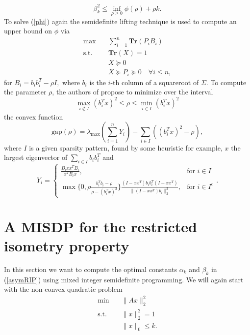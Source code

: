 \documentclass{elsarticle}
\begin{document}
\begin{equation*}
 \beta_k^2 \leq \inf_{\rho \geq 0} \phi(\rho) + \rho k.
\end{equation*}
To solve (\ref{phi}) again the semidefinite lifting technique is used to compute an upper bound on $\phi$ via
\begin{align}\label{Asp08}
 \text{max} \quad & \sum_{i=1}^n\textbf{Tr}(P_iB_i) \nonumber \\
 \text{s.t.} \quad & \textbf{Tr}(X) = 1 \nonumber \\
 & X \succeq 0 \tag{Asp08} \\
 & X \succeq P_i \succeq 0 \quad \forall i \leq n, \nonumber
\end{align}
for $B_i = b_ib_i^T - \rho I,$ where $b_i$ is the $i$-th column of a squareroot of $\Sigma$. To compute the parameter $\rho$, the authors of \cite{Asp07} propose to minimize over the interval
\begin{equation*}
 \max_{i \notin I} (b_i^Tx)^2 \leq \rho \leq  \min_{i \in I} (b_i^Tx)^2
\end{equation*}
the convex function
\begin{equation*}
 \text{gap}(\rho) = \lambda_{\max} \left( \sum_{i=1}^n Y_i \right) - \sum_{i \in I} ((b_i^Tx)^2 - \rho),
\end{equation*}
where $I$ is a given sparsity pattern, found by some heuristic for example, $x$ the largest eigenvector of $\sum_{i \in I} b_i b_i^T$ and
\begin{equation*}
 Y_i = \begin{cases}\frac{B_ixx^TB_i}{x^TB_ix}, & \text{for } i \in I \\ \max\{0, \rho \frac{b_i^Tb_i - \rho}{\rho - (b_i^Tx)^2} \} \frac{(I-xx^T)b_ib_i^T(I-xx^T)}{\|(I-xx^T)b_i\|_2^2}, & \text{for } i \in I^c\end{cases}. 
\end{equation*}


\section{A MISDP for the restricted isometry property}

In this section we want to compute the optimal constants $\alpha_k$ and $\beta_k$ in (\ref{asymRIP}) using mixed integer semidefinite programming. We will again start with the non-convex quadratic problem
\begin{align}\label{QP2}
 \text{min} \quad & \|Ax\|_2^2 \nonumber \\
 \text{s.t.} \quad & \|x\|_2^2 = 1 \tag{QP} \\
 & \|x\|_0 \leq k. \nonumber
\end{align}
\end{document}
